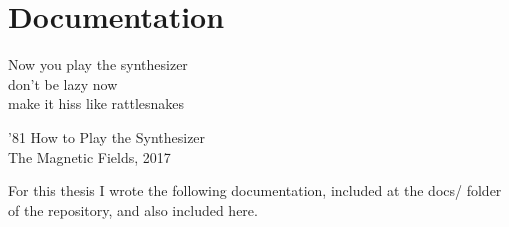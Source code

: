 \chapter{Documentation}

\epigraph{Now you play the synthesizer \\ don't be lazy now \\ make it hiss like rattlesnakes}{'81 How to Play the Synthesizer \\ The Magnetic Fields, 2017}

For this thesis I wrote the following documentation, included at the docs/ folder of the repository, and also included here.








